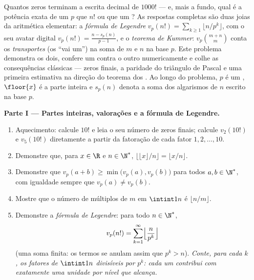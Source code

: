 \begin{problem}\label{pb:b1:arith:1}
Quantos zeros terminam a escrita decimal de $1000!$ --- e, mais a
fundo, qual é a potência exata de um  $p$ que  $n!$ ou que
 um ? As respostas completas são duas joias
da aritmética elementar: a \emph{fórmula de Legendre}
 $v_p(n!) = \sum_{k\geq1}
\lfloor n/p^k \rfloor$, com o seu avatar digital $v_p(n!) = \frac{n
- s_p(n)}{p-1}$, e o \emph{teorema de Kummer}: $v_p\binom{m+n}m$ conta os \emph{transportes} (os ``vai um'') na
soma de $m$ e $n$ na base $p$. Este problema demonstra os dois, confere
um contra o outro numericamente e colhe as consequências clássicas ---
zeros finais, a paridade do triângulo de Pascal e uma primeira
estimativa na direção do teorema dos .
Ao longo do problema, $p$ é um , $\floor{x}$ é a parte inteira e
$s_p(n)$ denota a soma dos algarismos de $n$ escrito na base $p$.

\medskip
\noindent\textbf{Parte I --- Partes inteiras, valorações e a fórmula
de Legendre.}
\begin{enumerate}
  \item Aquecimento: calcule $10!$ e leia o seu número de zeros
        finais; calcule $v_2(10!)$ e $v_5(10!)$ diretamente a partir da
        fatoração de cada fator $1, 2, \dots, 10$.
  \item Demonstre que, para $x \in \R$ e $n \in \N^*$,
        $\bigl\lfloor \lfloor x \rfloor / n \bigr\rfloor =
        \lfloor x/n \rfloor$.
  \item Demonstre que $v_p(a + b) \geq \min\bigl(v_p(a),
        v_p(b)\bigr)$ para todos $a, b \in \N^*$, com igualdade
        sempre que $v_p(a) \neq v_p(b)$.
  \item Mostre que o número de múltiplos de $m$ em $\intint1n$ é
        $\lfloor n/m \rfloor$.
  \item Demonstre a \emph{fórmula de Legendre}: para todo $n \in \N^*$,
        \[
        v_p(n!) = \sum_{k=1}^{\infty}
        \Bigl\lfloor \frac{n}{p^k} \Bigr\rfloor
        \]
        (uma soma finita: os termos se anulam assim que $p^k > n$).
        \emph{Conte, para cada $k$, os fatores de $\intint1n$
        divisíveis por $p^k$: cada um contribui com exatamente uma
        unidade por nível que alcança.}
\end{enumerate}


\end{problem}
